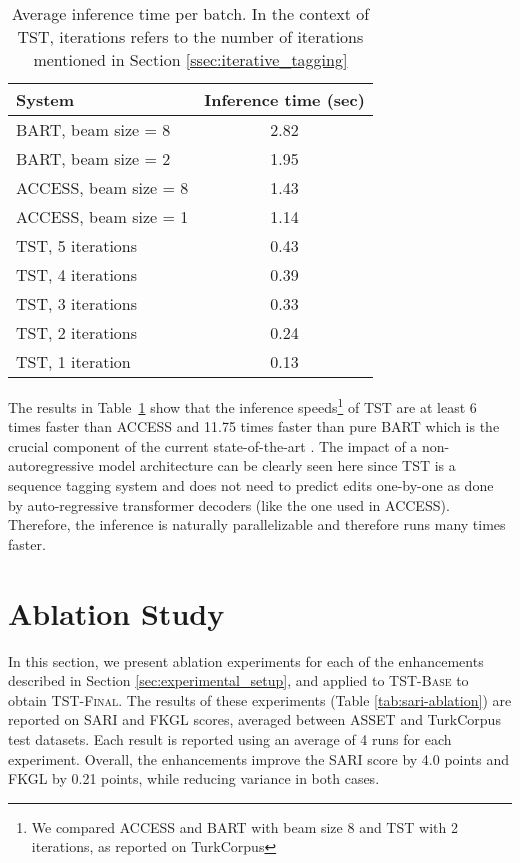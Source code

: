 \documentclass[11pt,a4paper]{article}
\begin{document}
\begin{table}
\begin{center}
\small
\begin{tabular}{lc}
\toprule
\textbf{System} & \textbf{Inference time (sec)} \\
\toprule
BART, beam size = 8 & 2.82\\
BART, beam size = 2 & 1.95\\
ACCESS, beam size = 8 & 1.43\\
ACCESS, beam size = 1 & 1.14\\
\midrule
TST, 5 iterations & 0.43\\
TST, 4 iterations & 0.39\\
TST, 3 iterations & 0.33\\
TST, 2 iterations & 0.24\\
TST, 1 iteration & 0.13\\
\bottomrule
\end{tabular}
\caption{Average inference time per batch. In the context of TST, iterations refers to the number of iterations mentioned in Section \ref{ssec:iterative_tagging}}
\label{tab:inference-time}
\end{center}
\end{table}

The results in Table~\ref{tab:inference-time} show that the inference speeds\footnote{We compared ACCESS and BART with beam size 8 and TST with 2 iterations, as reported on TurkCorpus} of TST are at least 6 times faster than \textsc{ACCESS} and 11.75 times faster than pure \textsc{BART} which is the crucial component of the current state-of-the-art \cite{martin2020multilingual}. The impact of a non-autoregressive model architecture can be clearly seen here since TST is a sequence tagging system and does not need to predict edits one-by-one as done by auto-regressive transformer decoders (like the one used in \textsc{ACCESS}). Therefore, the inference is naturally parallelizable and therefore runs many times faster.

\section{Ablation Study}

\label{sec:ablation_studies}
In this section, we present ablation experiments for each of the enhancements described in Section \ref{sec:experimental_setup}, and applied to \textsc{TST-Base} to obtain \textsc{TST-Final}. The results of these experiments (Table \ref{tab:sari-ablation}) are reported on SARI and FKGL scores, averaged between ASSET and TurkCorpus test datasets. Each result is reported using an average of 4 runs for each experiment. Overall, the enhancements improve the SARI score by 4.0 points and FKGL by 0.21 points, while reducing variance in both cases. 
\end{document}
